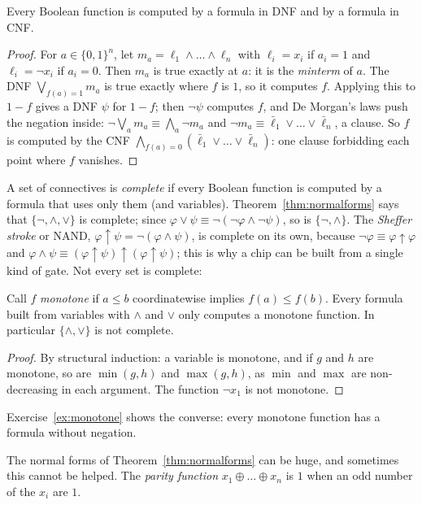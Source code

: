 \begin{theorem}\label{thm:normalforms}
Every Boolean function is computed by a formula in DNF and by a formula in CNF.
\end{theorem}
\begin{proof}
For $a\in\{0,1\}^n$, let $m_a=\ell_1\land\dots\land\ell_n$ with $\ell_i=x_i$ if $a_i=1$ and $\ell_i=\neg x_i$ if $a_i=0$. Then $m_a$ is true exactly at
$a$: it is the \emph{minterm} of $a$. The DNF $\bigvee_{f(a)=1}m_a$ is true exactly where $f$ is $1$, so it computes $f$. Applying
this to $1-f$ gives a DNF $\psi$ for $1-f$; then $\neg\psi$ computes $f$, and De Morgan's laws push the negation inside: $\neg\bigvee_a m_a\equiv\bigwedge_a\neg m_a$
and $\neg m_a\equiv\bar\ell_1\lor\dots\lor\bar\ell_n$, a clause. So $f$ is computed by the CNF $\bigwedge_{f(a)=0}(\bar\ell_1\lor\dots\lor\bar\ell_n)$: one clause forbidding each
point where $f$ vanishes.
\end{proof}

A set of connectives is \emph{complete} if every Boolean function is computed by a formula that uses only them (and
variables). Theorem~\ref{thm:normalforms} says that $\{\neg,\land,\lor\}$ is complete; since $\varphi\lor\psi\equiv\neg(\neg\varphi\land\neg\psi)$, so is $\{\neg,\land\}$. The
\emph{Sheffer stroke} or NAND, $\varphi\uparrow\psi=\neg(\varphi\land\psi)$, is complete on its own, because $\neg\varphi\equiv\varphi\uparrow\varphi$ and $\varphi\land\psi\equiv(\varphi\uparrow\psi)\uparrow(\varphi\uparrow\psi)$;
this is why a chip can be built from a single kind of gate. Not every set is complete:

\begin{proposition}\label{prop:monotone}
Call $f$ \emph{monotone} if $a\le b$ coordinatewise implies $f(a)\le f(b)$. Every formula built from variables with $\land$ and
$\lor$ only computes a monotone function. In particular $\{\land,\lor\}$ is not complete.
\end{proposition}
\begin{proof}
By structural induction: a variable is monotone, and if $g$ and $h$ are monotone, so are $\min(g,h)$ and $\max(g,h)$, as
$\min$ and $\max$ are non-decreasing in each argument. The function $\neg x_1$ is not monotone.
\end{proof}

Exercise~\ref{ex:monotone} shows the converse: every monotone function has a formula without negation.

The normal forms of Theorem~\ref{thm:normalforms} can be huge, and sometimes this cannot be helped. The \emph{parity
function} $x_1\oplus\dots\oplus x_n$ is $1$ when an odd number of the $x_i$ are $1$.

